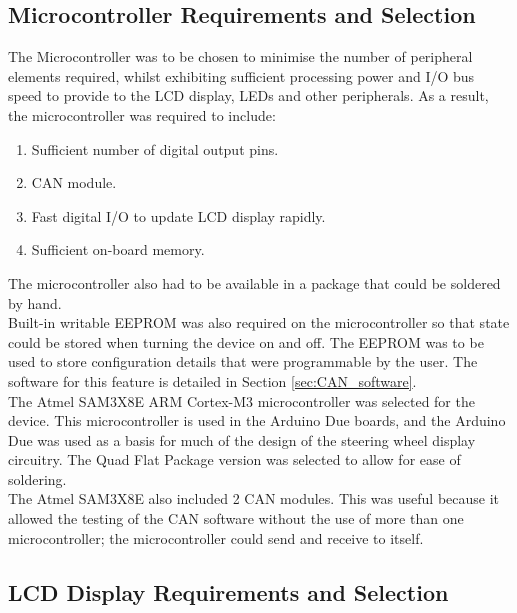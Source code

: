 \documentclass[a4paper,12pt]{article}
\begin{document}
\subsection{Microcontroller Requirements and Selection}
\label{sec:microcontroller}

The Microcontroller was to be chosen to minimise the number of peripheral elements required, whilst exhibiting sufficient processing power and I/O bus speed to provide to the LCD display, LEDs and other peripherals. As a result, the microcontroller was required to include:

\begin{enumerate}
  \item Sufficient number of digital output pins.
  \item CAN module.
  \item Fast digital I/O to update LCD display rapidly.
  \item Sufficient on-board memory.
\end{enumerate}

The microcontroller also had to be available in a package that could be soldered by hand. \\

Built-in writable EEPROM was also required on the microcontroller so that state could be stored when turning the device on and off. The EEPROM was to be used to store configuration details that were programmable by the user. The software for this feature is detailed in Section \ref{sec:CAN_software}. \\

The Atmel SAM3X8E ARM Cortex-M3 microcontroller was selected for the device. This microcontroller is used in the Arduino Due boards, and the Arduino Due was used as a basis for much of the design of the steering wheel display circuitry. The Quad Flat Package version was selected to allow for ease of soldering. \\

The Atmel SAM3X8E also included 2 CAN modules. This was useful because it allowed the testing of the CAN software without the use of more than one microcontroller; the microcontroller could send and receive to itself. \\

\subsection{LCD Display Requirements and Selection}
\label{sec:display}
\end{document}
